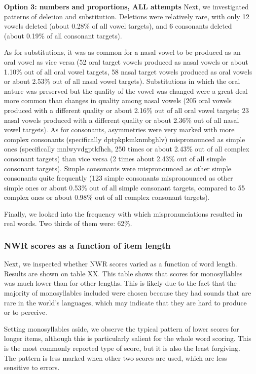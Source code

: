 \documentclass[english,,man,floatsintext]{apa6}
\begin{document}
\textbf{Option 3: numbers and proportions, ALL attempts}
Next, we investigated patterns of deletion and substitution. Deletions were relatively rare, with only 12 vowels deleted (about 0.28\% of all vowel targets), and 6 consonants deleted (about 0.19\% of all consonant targets).

As for substitutions, it was as common for a nasal vowel to be produced as an oral vowel as vice versa (52 oral target vowels produced as nasal vowels or about 1.10\% out of all oral vowel targets, 58 nasal target vowels produced as oral vowels or about 2.53\% out of all nasal vowel targets). Substitutions in which the oral nature was preserved but the quality of the vowel was changed were a great deal more common than changes in quality among nasal vowels (205 oral vowels produced with a different quality or about 2.16\% out of all oral vowel targets; 23 nasal vowels produced with a different quality or about 2.36\% out of all nasal vowel targets). As for consonants, asymmetries were very marked with more complex consonants (specifically dptpkpkmknmbghlv) mispronounced as simple ones (specifically mnlwyvdgptkfhch, 250 times or about 2.43\% out of all complex consonant targets) than vice versa (2 times about 2.43\% out of all simple consonant targets). Simple consonants were mispronounced as other simple consonants quite frequently (123 simple consonants mispronounced as other simple ones or about 0.53\% out of all simple consonant targets, compared to 55 complex ones or about 0.98\% out of all complex consonant targets).

Finally, we looked into the frequency with which mispronunciations resulted in real words. Two thirds of them were: 62\%.

\hypertarget{nwr-scores-as-a-function-of-item-length}{%
\subsubsection{NWR scores as a function of item length}\label{nwr-scores-as-a-function-of-item-length}}

Next, we inspected whether NWR scores varied as a function of word length. Results are shown on table XX. This table shows that scores for monosyllables was much lower than for other lengths. This is likely due to the fact that the majority of monosyllables included were chosen because they had sounds that are rare in the world's languages, which may indicate that they are hard to produce or to perceive.

Setting monosyllables aside, we observe the typical pattern of lower scores for longer items, although this is particularly salient for the whole word scoring. This is the most commonly reported type of score, but it is also the least forgiving. The pattern is less marked when other two scores are used, which are less sensitive to errors.
\end{document}
